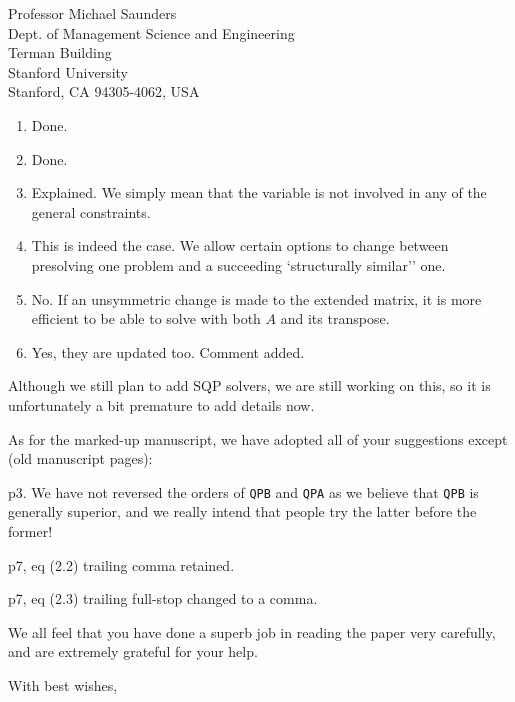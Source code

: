 \documentclass[12pt,a4paper]{letter}
\begin{document}
\begin{letter}{Professor Michael Saunders \\
Dept. of Management Science and Engineering \\
Terman Building \\
Stanford University \\
Stanford, CA 94305-4062, USA}
\begin{enumerate}
\item Done.

\item Done.

\item Explained. We simply mean that the variable is not involved in
any of the general constraints.

\item This is indeed the case. We allow certain options to change
between presolving one problem and a succeeding `structurally similar'' one.

\item No. If an unsymmetric change is made to the extended matrix, it
is more efficient to be able to solve with both $A$ and its transpose.

\item Yes, they are updated too. Comment added.
\end{enumerate}
Although we still plan to add SQP solvers, we are still working on this,
so it is unfortunately a bit premature to add details now.

As for the marked-up manuscript, we have adopted all of your suggestions
except (old manuscript pages):

\begin{description}
\item p3. We have not reversed the orders of 
{\tt QPB} and {\tt QPA} as we believe that
{\tt QPB} is generally superior, and we really intend that
people try the latter before the former!

\item p7, eq (2.2) trailing comma retained.

\item p7, eq (2.3) trailing full-stop changed to a comma.
\end{description}

We all feel that you have done a superb job in reading the
paper very carefully, and are extremely grateful for your help.

\closing{With best wishes,}

\end{letter} 
\end{document}
